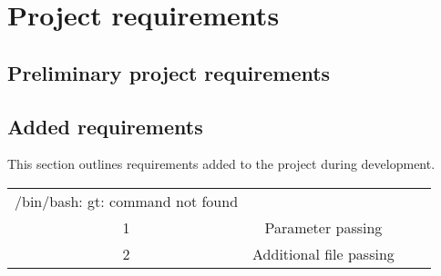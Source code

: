 \section{Project requirements}

\subsection{Preliminary project requirements}









\subsection{Added requirements}

This section outlines requirements added to the project during development.

\begin{center}
  \begin{tabular}{ c| c | c | c }
/bin/bash: gt: command not found
    \hline \\
    1 & Parameter passing & & \\
    2 & Additional file passing & & \\
  \end{tabular}
\end{center}

